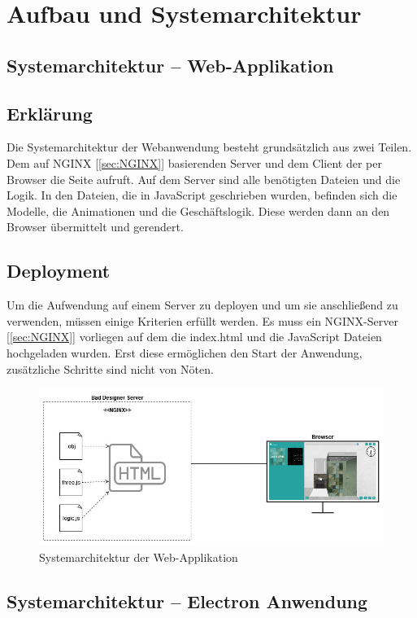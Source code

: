 \chapter{Aufbau und Systemarchitektur}

\section{Systemarchitektur – Web-Applikation}

\section*{Erklärung}
Die Systemarchitektur der Webanwendung besteht grundsätzlich aus zwei Teilen. Dem auf NGINX [\ref{sec:NGINX}] basierenden Server und dem Client der per Browser die Seite aufruft. Auf dem Server sind alle benötigten Dateien und die Logik. In den Dateien, die in JavaScript geschrieben wurden, befinden sich die Modelle, die Animationen und die Geschäftslogik. Diese werden dann an den Browser übermittelt und gerendert.

\section*{Deployment}
Um die Aufwendung auf einem Server zu deployen und um sie anschließend zu verwenden, müssen einige Kriterien erfüllt werden. Es muss ein NGINX-Server [\ref{sec:NGINX}] vorliegen auf dem die index.html und die JavaScript Dateien hochgeladen wurden. Erst diese ermöglichen den Start der Anwendung, zusätzliche Schritte sind nicht von Nöten.

\begin{figure}
    \centering
    \includegraphics[scale=.4]{images/DA-SysArch.jpg}
    \caption{Systemarchitektur der Web-Applikation}
\end{figure}


\section{Systemarchitektur – Electron Anwendung}

